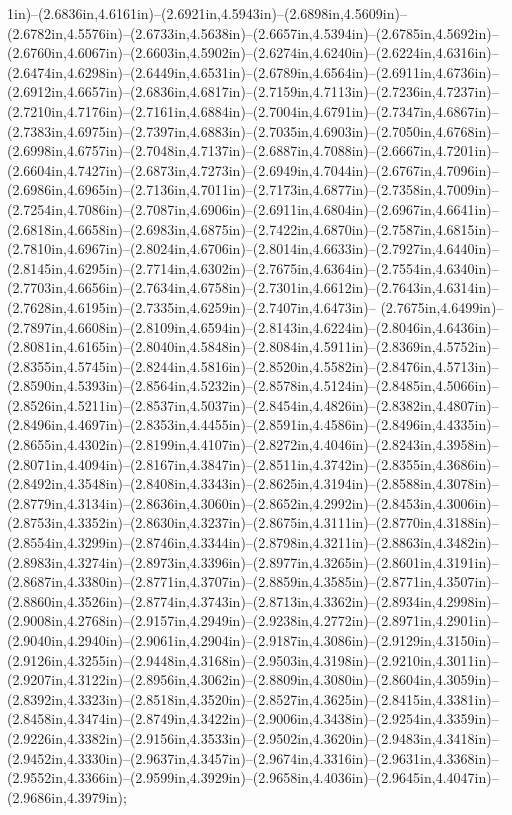 1in)--(2.6836in,4.6161in)--(2.6921in,4.5943in)--(2.6898in,4.5609in)--(2.6782in,4.5576in)--(2.6733in,4.5638in)--(2.6657in,4.5394in)--(2.6785in,4.5692in)--(2.6760in,4.6067in)--(2.6603in,4.5902in)--(2.6274in,4.6240in)--(2.6224in,4.6316in)--(2.6474in,4.6298in)--(2.6449in,4.6531in)--(2.6789in,4.6564in)--(2.6911in,4.6736in)--(2.6912in,4.6657in)--(2.6836in,4.6817in)--(2.7159in,4.7113in)--(2.7236in,4.7237in)--(2.7210in,4.7176in)--(2.7161in,4.6884in)--(2.7004in,4.6791in)--(2.7347in,4.6867in)--(2.7383in,4.6975in)--(2.7397in,4.6883in)--(2.7035in,4.6903in)--(2.7050in,4.6768in)--(2.6998in,4.6757in)--(2.7048in,4.7137in)--(2.6887in,4.7088in)--(2.6667in,4.7201in)--(2.6604in,4.7427in)--(2.6873in,4.7273in)--(2.6949in,4.7044in)--(2.6767in,4.7096in)--(2.6986in,4.6965in)--(2.7136in,4.7011in)--(2.7173in,4.6877in)--(2.7358in,4.7009in)--(2.7254in,4.7086in)--(2.7087in,4.6906in)--(2.6911in,4.6804in)--(2.6967in,4.6641in)--(2.6818in,4.6658in)--(2.6983in,4.6875in)--(2.7422in,4.6870in)--(2.7587in,4.6815in)--(2.7810in,4.6967in)--(2.8024in,4.6706in)--(2.8014in,4.6633in)--(2.7927in,4.6440in)--(2.8145in,4.6295in)--(2.7714in,4.6302in)--(2.7675in,4.6364in)--(2.7554in,4.6340in)--(2.7703in,4.6656in)--(2.7634in,4.6758in)--(2.7301in,4.6612in)--(2.7643in,4.6314in)--(2.7628in,4.6195in)--(2.7335in,4.6259in)--(2.7407in,4.6473in)--
(2.7675in,4.6499in)--(2.7897in,4.6608in)--(2.8109in,4.6594in)--(2.8143in,4.6224in)--(2.8046in,4.6436in)--(2.8081in,4.6165in)--(2.8040in,4.5848in)--(2.8084in,4.5911in)--(2.8369in,4.5752in)--(2.8355in,4.5745in)--(2.8244in,4.5816in)--(2.8520in,4.5582in)--(2.8476in,4.5713in)--(2.8590in,4.5393in)--(2.8564in,4.5232in)--(2.8578in,4.5124in)--(2.8485in,4.5066in)--(2.8526in,4.5211in)--(2.8537in,4.5037in)--(2.8454in,4.4826in)--(2.8382in,4.4807in)--(2.8496in,4.4697in)--(2.8353in,4.4455in)--(2.8591in,4.4586in)--(2.8496in,4.4335in)--(2.8655in,4.4302in)--(2.8199in,4.4107in)--(2.8272in,4.4046in)--(2.8243in,4.3958in)--(2.8071in,4.4094in)--(2.8167in,4.3847in)--(2.8511in,4.3742in)--(2.8355in,4.3686in)--(2.8492in,4.3548in)--(2.8408in,4.3343in)--(2.8625in,4.3194in)--(2.8588in,4.3078in)--(2.8779in,4.3134in)--(2.8636in,4.3060in)--(2.8652in,4.2992in)--(2.8453in,4.3006in)--(2.8753in,4.3352in)--(2.8630in,4.3237in)--(2.8675in,4.3111in)--(2.8770in,4.3188in)--(2.8554in,4.3299in)--(2.8746in,4.3344in)--(2.8798in,4.3211in)--(2.8863in,4.3482in)--(2.8983in,4.3274in)--(2.8973in,4.3396in)--(2.8977in,4.3265in)--(2.8601in,4.3191in)--(2.8687in,4.3380in)--(2.8771in,4.3707in)--(2.8859in,4.3585in)--(2.8771in,4.3507in)--(2.8860in,4.3526in)--(2.8774in,4.3743in)--(2.8713in,4.3362in)--(2.8934in,4.2998in)--(2.9008in,4.2768in)--(2.9157in,4.2949in)--(2.9238in,4.2772in)--(2.8971in,4.2901in)--(2.9040in,4.2940in)--(2.9061in,4.2904in)--(2.9187in,4.3086in)--(2.9129in,4.3150in)--(2.9126in,4.3255in)--(2.9448in,4.3168in)--(2.9503in,4.3198in)--(2.9210in,4.3011in)--(2.9207in,4.3122in)--(2.8956in,4.3062in)--(2.8809in,4.3080in)--(2.8604in,4.3059in)--(2.8392in,4.3323in)--(2.8518in,4.3520in)--(2.8527in,4.3625in)--(2.8415in,4.3381in)--(2.8458in,4.3474in)--(2.8749in,4.3422in)--(2.9006in,4.3438in)--(2.9254in,4.3359in)--(2.9226in,4.3382in)--(2.9156in,4.3533in)--(2.9502in,4.3620in)--(2.9483in,4.3418in)--(2.9452in,4.3330in)--(2.9637in,4.3457in)--(2.9674in,4.3316in)--(2.9631in,4.3368in)--(2.9552in,4.3366in)--(2.9599in,4.3929in)--(2.9658in,4.4036in)--(2.9645in,4.4047in)--(2.9686in,4.3979in);
